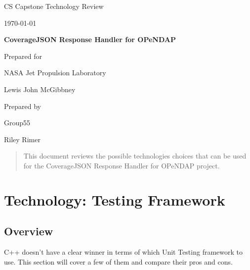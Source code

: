 \documentclass[onecolumn, draftclsnofoot,10pt, compsoc]{IEEEtran}
\def \CapstoneTeamNumber{55}
\def \GroupMemberOne{Riley Rimer}
\def \CapstoneProjectName{CoverageJSON Response Handler for OPeNDAP}
\def \CapstoneSponsorCompany{NASA Jet Propulsion Laboratory}
\def \CapstoneSponsorPerson{Lewis John McGibbney}
\def \DocType{	%
				Technology Review
				}
\newcommand{\NameSigPair}[1]{\par
\makebox[2.75in][r]{#1} \hfil 	\makebox[3.25in]{\makebox[2.25in]{\hrulefill} \hfill		\makebox[.75in]{\hrulefill}}
\par\vspace{-12pt} \textit{\tiny\noindent
\makebox[2.75in]{} \hfil	\makebox[3.25in]{\makebox[2.25in][r]{Signature} \hfill	\makebox[.75in][r]{Date}}}}
\renewcommand{\NameSigPair}[1]{#1}
\begin{document}
\begin{titlepage}
    \begin{singlespace}
        \hfill    
        \par\vspace{.2in}
        \centering
        \scshape{
            \huge CS Capstone \DocType \par
            {\large\today}\par
            \vspace{.5in}
            \textbf{\Huge\CapstoneProjectName}\par
                        \vspace{.5in}

            \vfill
            {\large Prepared for}\par
            \Huge \CapstoneSponsorCompany\par
            \vspace{5pt}
            {\Large\NameSigPair{\CapstoneSponsorPerson}\par}
            {\large Prepared by }\par
            Group\CapstoneTeamNumber\par
            \vspace{5pt}
            {\Large
                \NameSigPair{\GroupMemberOne}\par
            }
            \vspace{20pt}
        }
        \begin{abstract}
        	This document reviews the possible technologies choices that can be used for the CoverageJSON Response Handler for OPeNDAP project. 
        \end{abstract}     
    \end{singlespace}
\end{titlepage}
\newpage
{}
\clearpage
\section{Technology: Testing Framework}

\subsection{Overview}
C++ doesn't have a clear winner in terms of which Unit Testing framework to use. This section will cover a few of them and compare their pros and cons.
\end{document}
